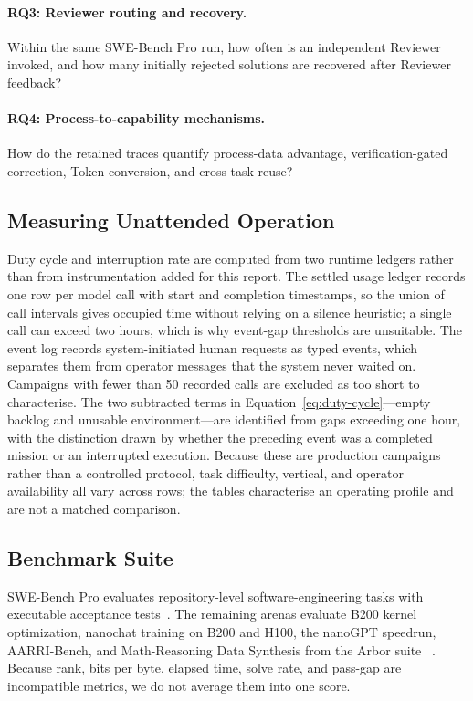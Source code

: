 \paragraph{RQ3: Reviewer routing and recovery.}
Within the same SWE-Bench Pro run, how often is an independent Reviewer invoked,
and how many initially rejected solutions are recovered after Reviewer feedback?

\paragraph{RQ4: Process-to-capability mechanisms.}
How do the retained traces quantify process-data advantage, verification-gated
correction, Token conversion, and cross-task reuse?

\subsection{Measuring Unattended Operation}

Duty cycle and interruption rate are computed from two runtime ledgers rather than
from instrumentation added for this report. The settled usage ledger records one row
per model call with start and completion timestamps, so the union of call intervals
gives occupied time without relying on a silence heuristic; a single call can exceed
two hours, which is why event-gap thresholds are unsuitable. The event log records
system-initiated human requests as typed events, which separates them from operator
messages that the system never waited on. Campaigns with fewer than 50 recorded calls
are excluded as too short to characterise. The two subtracted terms in
Equation~\ref{eq:duty-cycle}---empty backlog and unusable environment---are
identified from gaps exceeding one hour, with the distinction drawn by whether the
preceding event was a completed mission or an interrupted execution. Because these
are production campaigns rather than a controlled protocol, task difficulty, vertical,
and operator availability all vary across rows; the tables characterise an operating
profile and are not a matched comparison.

\subsection{Benchmark Suite}

SWE-Bench Pro evaluates repository-level software-engineering tasks with executable
acceptance tests~\citep{deng2025swebenchpro}. The remaining arenas evaluate B200
kernel optimization, nanochat training on B200 and H100, the nanoGPT speedrun,
AARRI-Bench, and Math-Reasoning Data Synthesis from the Arbor suite
~\citep{lin2026solexecbench,karpathy_nanochat,karpathy_autoresearch,
jordan_nanogptbench,wang2026aarri,jin2026arbor}. Because rank, bits per byte,
elapsed time, solve rate, and pass-gap are incompatible metrics, we do not average
them into one score.

